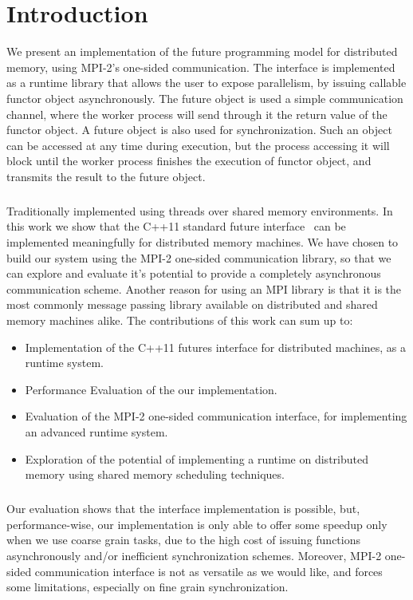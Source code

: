\chapter{Introduction}
We present an implementation of the future programming model for distributed memory,
using MPI-2's one-sided communication.  The interface is implemented as a runtime 
library that allows the user to  expose parallelism, by issuing callable functor object 
asynchronously.  The future object is used a simple communication channel, where the worker process 
will send through it the return value of the functor object. 
A future object is also used for synchronization. Such an object can be accessed at any time during execution,
but the process accessing it will block until the worker process finishes the execution of functor object, and
transmits the result to the future object.

\paragraph{}
Traditionally implemented using threads over shared memory environments.  
In this work we show that the C++11 standard future interface~\cite{CPP:Threads} can be implemented meaningfully 
for distributed memory machines.  We have chosen to build our system using the MPI-2 one-sided
communication library, so that we can explore and evaluate it's potential to provide a completely asynchronous
communication scheme.  Another reason for using an MPI library is that it is the most commonly message passing
library available on distributed and shared memory machines alike.  
The contributions of this work can sum up to:
\\
\begin{itemize}
	\item Implementation of the C++11 futures interface for distributed machines, as a runtime system.
	\item Performance Evaluation of the our implementation. 
	\item Evaluation of the MPI-2 one-sided communication interface, for implementing an advanced runtime system.
	\item Exploration of the potential of implementing a runtime on distributed memory using shared memory scheduling techniques.
\end{itemize}

\paragraph{}
Our evaluation shows that the interface implementation is possible, but, performance-wise,  our implementation 
is only able to offer some speedup only when we use coarse grain tasks, due to the high cost of issuing functions 
asynchronously and/or inefficient synchronization schemes. Moreover, MPI-2 one-sided communication interface is 
not as versatile as we would like, and forces some limitations, especially on fine grain synchronization.  

